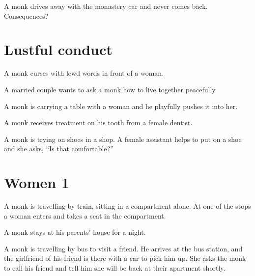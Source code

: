 A monk drives away with the monastery car and never comes back.
Consequences?

\section{Lustful conduct}

A monk curses with lewd words in front of a woman.

A married couple wants to ask a monk how to live together peacefully.

A monk is carrying a table with a woman and he playfully pushes it into
her.

A monk receives treatment on his tooth from a female dentist.

A monk is trying on shoes in a shop. A female assistant helps to put on
a shoe and she asks, ``Is that comfortable?''

\section{Women 1}

\enlargethispage{2\baselineskip}

A monk is travelling by train, sitting in a compartment alone. At one of
the stops a woman enters and takes a seat in the compartment.

A monk stays at his parents' house for a night.

A monk is travelling by bus to visit a friend. He arrives at the bus
station, and the girlfriend of his friend is there with a car to pick
him up. She asks the monk to call his friend and tell him she will be
back at their apartment shortly.

